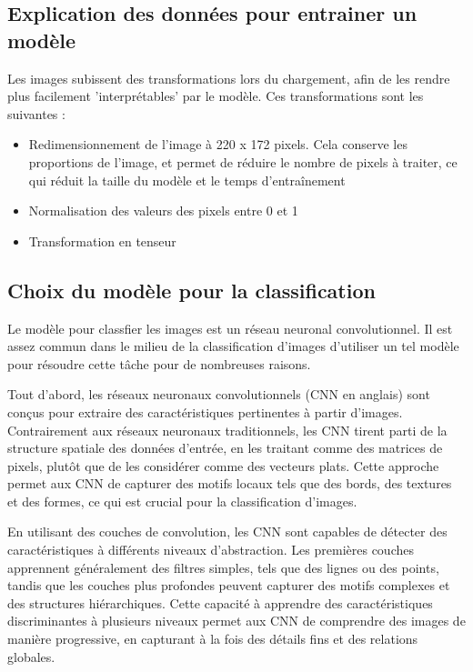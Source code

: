 \subsection{Explication des données pour entrainer un modèle}

Les images subissent des transformations lors du chargement, afin de les rendre plus facilement 'interprétables' par le modèle. Ces transformations sont les suivantes :
\begin{itemize}
    \item Redimensionnement de l'image à 220 x 172 pixels. Cela conserve les proportions de l'image, et permet de réduire le nombre de pixels à traiter, ce qui réduit la taille du modèle et le temps d'entraînement
    \item Normalisation des valeurs des pixels entre 0 et 1
    \item Transformation en tenseur
\end{itemize}

\subsection{Choix du modèle pour la classification}

Le modèle pour classfier les images est un réseau neuronal convolutionnel. Il est assez commun dans le milieu de la classification d'images d'utiliser un tel modèle pour résoudre cette tâche pour de nombreuses raisons.


Tout d'abord, les réseaux neuronaux convolutionnels (CNN en anglais) sont conçus pour extraire des caractéristiques pertinentes à partir d'images. Contrairement aux réseaux neuronaux traditionnels, les CNN tirent parti de la structure spatiale des données d'entrée, en les traitant comme des matrices de pixels, plutôt que de les considérer comme des vecteurs plats. Cette approche permet aux CNN de capturer des motifs locaux tels que des bords, des textures et des formes, ce qui est crucial pour la classification d'images.


En utilisant des couches de convolution, les CNN sont capables de détecter des caractéristiques à différents niveaux d'abstraction. Les premières couches apprennent généralement des filtres simples, tels que des lignes ou des points, tandis que les couches plus profondes peuvent capturer des motifs complexes et des structures hiérarchiques. Cette capacité à apprendre des caractéristiques discriminantes à plusieurs niveaux permet aux CNN de comprendre des images de manière progressive, en capturant à la fois des détails fins et des relations globales.


